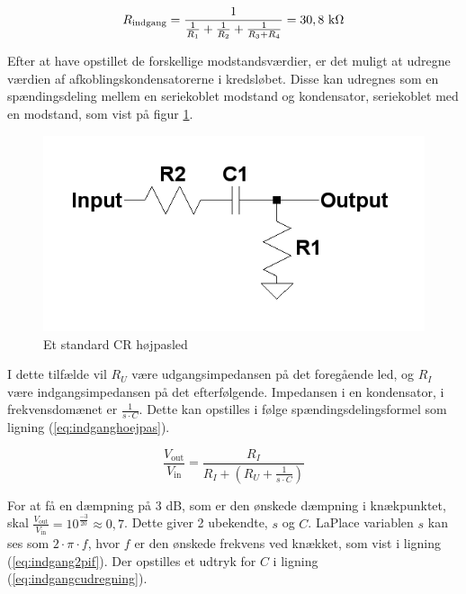 
\begin{equation}
\label{eq:indgangrindgang}
R_{\mathrm{indgang}}=\frac{1}{\frac{1}{R_1}+\frac{1}{R_2}+\frac{1}{R_3+R_4}}=30,8~\mathrm{k}\ohm
\end{equation}

Efter at have opstillet de forskellige modstandsværdier, er det muligt at udregne værdien af afkoblingskondensatorerne i kredsløbet. Disse kan udregnes som en spændingsdeling mellem en seriekoblet modstand og kondensator, seriekoblet med en modstand, som vist på figur \ref{crvd}.
\begin{figure}[h]
\centering
\includegraphics[scale=0.4]{teknisk/indgangsvaelger/hoejpasfilter.png}
\caption{Et standard CR højpasled}
\label{crvd}
\end{figure}
 I dette tilfælde vil $R_U$ være udgangsimpedansen på det foregående led, og $R_I$ være indgangsimpedansen på det efterfølgende. Impedansen i en kondensator, i frekvensdomænet er $\frac{1}{s\cdot C}$. Dette kan opstilles i følge spændingsdelingsformel som ligning (\ref{eq:indganghoejpas}).

\begin{equation}
\label{eq:indganghoejpas}
\frac{V_{\mathrm{out}}}{V_{\mathrm{in}}}=\frac{R_I}{R_I+(R_U+\frac{1}{s\cdot C})}
\end{equation}

For at få en dæmpning på 3 dB, som er den ønskede dæmpning i knækpunktet, skal $\frac{V_{\mathrm{out}}}{V_{\mathrm{in}}}=10^{\frac{-3}{20}}\approx0,7$. 
Dette giver 2 ubekendte, $s$ og $C$. LaPlace variablen $s$ kan ses som $2\cdot \pi \cdot f$, hvor $f$ er den ønskede frekvens ved knækket, som vist i ligning (\ref{eq:indgang2pif}). Der opstilles et udtryk for $C$ i ligning (\ref{eq:indgangcudregning}).

